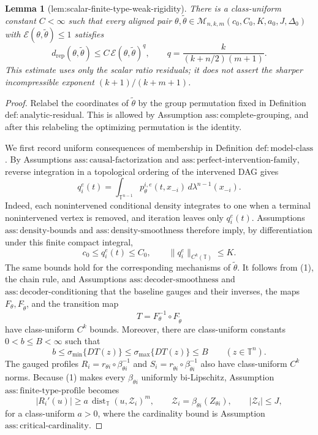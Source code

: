 \documentclass{article}
\newtheorem{lemma}{Lemma}
\begin{document}
\begin{lemma}[lem:scalar-finite-type-weak-rigidity]\label{lem:scalar-finite-type-weak-rigidity}
There is a class-uniform constant \(C<\infty\) such that every aligned pair \(\theta,\widetilde\theta\in\mathcal M_{n,k,m}(c_0,C_0,K,a_0,J,\Delta_0)\) with \(\mathcal E(\theta,\widetilde\theta)\leq1\) satisfies
\[
d_{\mathrm{rep}}(\theta,\widetilde\theta)
\leq C\,\mathcal E(\theta,\widetilde\theta)^q,
\qquad
q=\frac{k}{(k+n/2)(m+1)}.
\]
This estimate uses only the scalar ratio residuals; it does not assert the sharper incompressible exponent \((k+1)/(k+m+1)\).
\end{lemma}
\begin{proof}
Relabel the coordinates of \(\widetilde\theta\) by the group permutation fixed in Definition \(\mathrm{def:analytic\text{-}residual}\).  This is allowed by Assumption \(\mathrm{ass:complete\text{-}grouping}\), and after this relabeling the optimizing permutation is the identity.

We first record uniform consequences of membership in Definition \(\mathrm{def:model\text{-}class}\).  By Assumptions \(\mathrm{ass:causal\text{-}factorization}\) and \(\mathrm{ass:perfect\text{-}intervention\text{-}family}\), reverse integration in a topological ordering of the intervened DAG gives
\[
q_i^e(t)=\int_{\mathbb T^{n-1}}p_\theta^{i,e}(t,x_{-i})\,d\lambda^{n-1}(x_{-i}).
\]
Indeed, each nonintervened conditional density integrates to one when a terminal nonintervened vertex is removed, and iteration leaves only \(q_i^e(t)\).  Assumptions \(\mathrm{ass:density\text{-}bounds}\) and \(\mathrm{ass:density\text{-}smoothness}\) therefore imply, by differentiation under this finite compact integral,
\[
c_0\leq q_i^e(t)\leq C_0,
\qquad
\lVert q_i^e\rVert_{C^k(\mathbb T)}\leq K.
\tag{1}
\]
The same bounds hold for the corresponding mechanisms of \(\widetilde\theta\).  It follows from (1), the chain rule, and Assumptions \(\mathrm{ass:decoder\text{-}smoothness}\) and \(\mathrm{ass:decoder\text{-}conditioning}\) that the baseline gauges and their inverses, the maps \(F_\theta,F_{\widetilde\theta}\), and the transition map
\[
T=F_\theta^{-1}\circ F_{\widetilde\theta}
\]
have class-uniform \(C^k\) bounds.  Moreover, there are class-uniform constants \(0<b\leq B<\infty\) such that
\[
b\leq \sigma_{\min}\{DT(z)\}
\leq \sigma_{\max}\{DT(z)\}\leq B
\qquad(z\in\mathbb T^n).
\tag{2}
\]
The gauged profiles \(R_i=r_{\theta i}\circ\beta_{\theta i}^{-1}\) and \(S_i=r_{\widetilde\theta i}\circ\beta_{\widetilde\theta i}^{-1}\) also have class-uniform \(C^k\) norms.  Because (1) makes every \(\beta_{\theta i}\) uniformly bi-Lipschitz, Assumption \(\mathrm{ass:finite\text{-}type\text{-}profile}\) becomes
\[
|R_i'(u)|\geq a\,\operatorname{dist}_{\mathbb T}(u,\mathcal Z_i)^m,
\qquad
\mathcal Z_i=\beta_{\theta i}(Z_{\theta i}),
\qquad
|\mathcal Z_i|\leq J,
\tag{3}
\]
for a class-uniform \(a>0\), where the cardinality bound is Assumption \(\mathrm{ass:critical\text{-}cardinality}\).


\end{proof}
\end{document}
